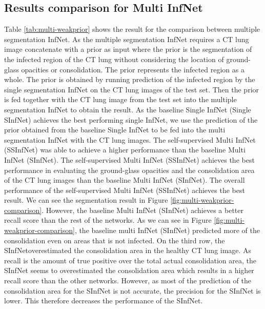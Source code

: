 \subsection{Results comparison for Multi InfNet}
Table \ref{tab:multi-weakprior} shows the result for the comparison between multiple segmentation InfNet. As the multiple segmentation InfNet requires a CT lung image concatenate with a prior as input where the prior is the segmentation of the infected region of the CT lung without considering the location of ground-glass opacities or consolidation. The prior represents the infected region as a whole. The prior is obtained by running prediction of the infected region by the single segmentation InfNet on the CT lung images of the test set. Then the prior is fed together with the CT lung image from the test set into the multiple segmentation InfNet to obtain the result. As the baseline Single InfNet (Single SInfNet) achieves the best performing single InfNet, we use the prediction of the prior obtained from the baseline Single InfNet to be fed into the multi segmentation InfNet with the CT lung images. The self-supervised Multi InfNet (SSInfNet) was able to achieve a higher performance than the baseline Multi InfNet (SInfNet). The self-supervised Multi InfNet (SSInfNet) achieves the best performance in evaluating the ground-glass opacities and the consolidation area of the CT lung images than the baseline Multi InfNet (SInfNet). The overall performance of the self-supervised Multi InfNet (SSInfNet) achieves the best result. We can see the segmentation result in Figure \ref{fig:multi-weakprior-comparison}. However, the baseline Multi InfNet (SInfNet) achieves a better recall score than the rest of the networks. As we can see in Figure \ref{fig:multi-weakprior-comparison}, the baseline multi InfNet (SInfNet) predicted more of the consolidation even on areas that is not infected. On the third row, the SInfNetoverestimated the consolidation area in the healthy CT lung image. As recall is the amount of true positive over the total actual consolidation area, the SInfNet seems to overestimated the consolidation area which results in a higher recall score than the other networks. However, as most of the prediction of the consolidation area for the SInfNet is not accurate, the precision for the SInfNet is lower. This therefore decreases the performance of the SInfNet.


